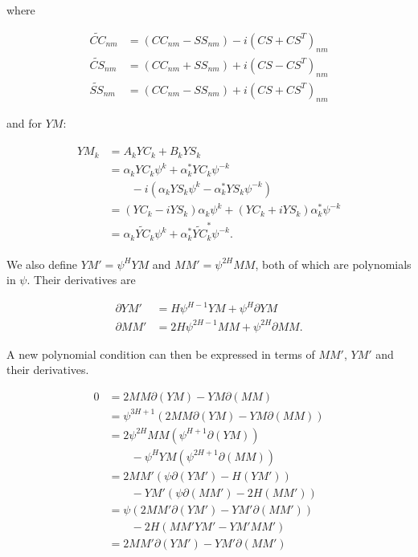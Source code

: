 \documentclass{aastex62}
\newcommand{\YCt}{\widetilde{YC}}
\newcommand{\CCt}{\widetilde{CC}}
\newcommand{\CSt}{\widetilde{CS}}
\newcommand{\SSt}{\widetilde{SS}}
\newcommand{\eith}{\psi}
\begin{document}
where

\begin{align}
\CCt_{nm}  &= (CC_{nm} - SS_{nm}) - i\left(CS + CS^T\right)_{nm} \\
\CSt_{nm}  &= (CC_{nm} + SS_{nm}) + i\left(CS - CS^T\right)_{nm}\\
\SSt_{nm}  &= (CC_{nm} - SS_{nm}) + i\left(CS + CS^T\right)_{nm}
\end{align}

and for $YM$:

\begin{align}
\begin{split}
YM_{k} &= A_kYC_k + B_kYS_k\\
        &= \alpha_kYC_k\eith^k + \alpha_k^{*}YC_k\eith^{-k} \\
        &\qquad - i\left(\alpha_kYS_k\eith^k - \alpha^{*}_kYS_k\eith^{-k}\right)\\
        &= (YC_k - iYS_k)\alpha_k\eith^k + (YC_k + iYS_k)\alpha^{*}_k\eith^{-k}\\
        &= \alpha_k\YCt_k \eith^k + \alpha^{*}_k\YCt_k^{*} \eith^{-k}.
\end{split}
\end{align}


We also define $YM' = \eith^H YM$ and $MM' = \eith^{2H}MM$, both of which are polynomials in $\eith$. Their derivatives
are

\begin{align}
\partial YM' &= H\eith^{H-1} YM + \eith^H \partial YM\\
\partial MM' &= 2H\eith^{2H-1} MM + \eith^{2H}\partial MM.
\end{align}

A new polynomial condition can then be expressed in terms of $MM'$, $YM'$ and their derivatives.

\begin{align}\label{eq:finalpoly}
0 &= 2MM\partial(YM) - YM\partial(MM)\\
  &= \eith^{3H+1}\left(2MM\partial(YM) - YM\partial(MM)\right)\\
  &= 2\eith^{2H}MM\left(\eith^{H+1}\partial(YM)\right) \nonumber \\
  &\qquad - \eith^HYM\left(\eith^{2H+1}\partial(MM)\right)\\
  &= 2MM'\left(\eith\partial(YM') - H(YM')\right) \nonumber \\
  &\qquad - YM'\left(\eith\partial(MM') - 2H(MM')\right)\\
  &= \eith\left(2MM'\partial(YM') - YM'\partial(MM')\right) \nonumber \\
  &\qquad- 2H\left(MM'YM' - YM'MM'\right)\\
  &= 2MM'\partial(YM') - YM'\partial(MM')
\end{align}
\end{document}
